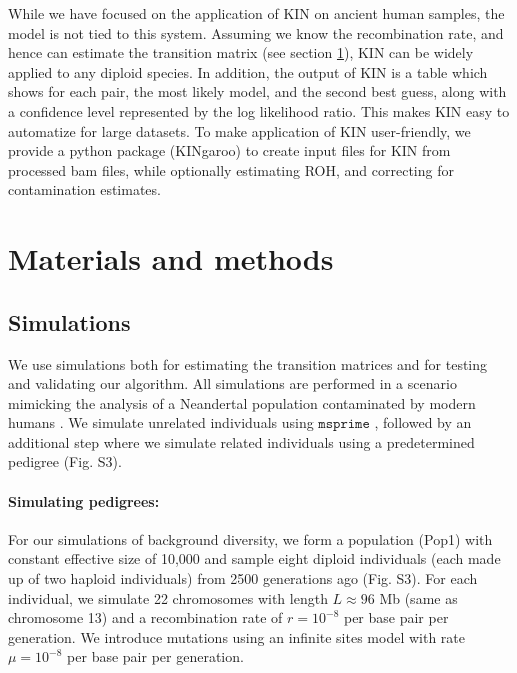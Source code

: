 \documentclass[12pt, letterpaper]{article}
\begin{document}
While we have focused on the application of KIN on ancient human samples, the model is not tied to this system. Assuming we know the recombination rate, and hence can estimate the transition matrix (see section \ref{method}), KIN can be widely applied to any diploid species. In addition, the output of KIN is a table which shows for each pair, the most likely model, and the second best guess, along with a confidence level represented by the log likelihood ratio. This makes KIN easy to automatize for large datasets. To make application of KIN user-friendly, we provide a python package (KINgaroo) to create input files for KIN from processed bam files, while optionally estimating ROH, and correcting for contamination estimates.


\section{Materials and methods}\label{method}

\subsection{Simulations}\label{simulat}
We use simulations both for estimating the transition matrices and for testing and validating our algorithm. All simulations are performed in a scenario mimicking the analysis of a Neandertal population contaminated by modern humans \cite{mafessoni_high-coverage_2020}. We simulate unrelated individuals using $\texttt{msprime}$ \cite{kelleher_efficient_2016}, followed by an additional step where we simulate related individuals using a predetermined pedigree (Fig. S3).

\paragraph{Simulating pedigrees:}

For our simulations of background diversity, we form a population (Pop1) with constant effective size of 10,000 and sample eight diploid individuals (each made up of two haploid individuals) from 2500 generations ago (Fig. S3). For each individual, we simulate 22 chromosomes with length $L\approx96$ Mb (same as chromosome 13) and a recombination rate of $r=10^{-8}$ per base pair per generation. We introduce mutations using an infinite sites model with rate  $\mu= 10^{-8}$ per base pair per generation.
\end{document}
